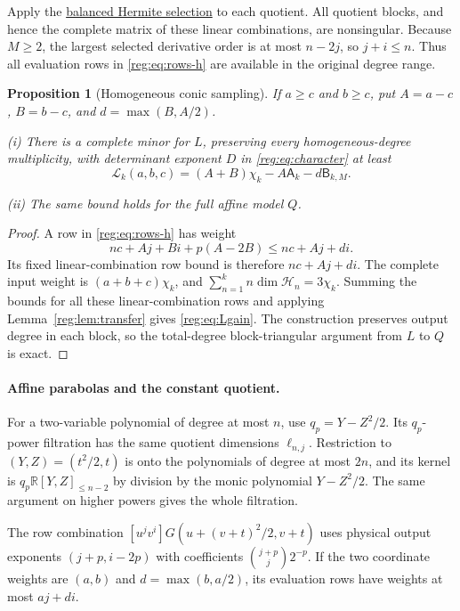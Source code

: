 \documentclass[11pt]{amsart}
\newtheorem{proposition}[theorem]{Proposition}
\theoremstyle{definition}
\theoremstyle{remark}
\newcommand{\R}{\mathbb R}
\numberwithin{equation}{section}
\begin{document}
Apply the \hyperref[reg:balanced-hermite]{balanced Hermite selection} to each quotient. All quotient blocks, and hence the complete matrix of these linear combinations, are nonsingular. Because $M\ge2$, the largest selected derivative order is at most $n-2j$, so $j+i\le n$. Thus all evaluation rows in \eqref{reg:eq:rows-h} are available in the original degree range.

\begin{proposition}[Homogeneous conic sampling]\label{reg:prop:L}
If $a\ge c$ and $b\ge c$, put $A=a-c$, $B=b-c$, and $d=\max(B,A/2)$.

\noindent\textup{(i)} There is a complete minor for $L$, preserving every homogeneous-degree multiplicity, with determinant exponent $D$ in \eqref{reg:eq:character} at least
\begin{equation}\label{reg:eq:Lgain}
 \mathcal L_k(a,b,c)=(A+B)\chi_k-A\mathsf A_k-d\mathsf B_{k,M}.
\end{equation}

\noindent\textup{(ii)} The same bound holds for the full affine model $Q$.
\end{proposition}
\begin{proof}
A row in \eqref{reg:eq:rows-h} has weight
\[
nc+Aj+Bi+p(A-2B)\le nc+Aj+di.
\]
Its fixed linear-combination row bound is therefore $nc+Aj+di$. The complete input weight is $(a+b+c)\chi_k$, and $\sum_{n=1}^k n\dim\mathcal H_n=3\chi_k$. Summing the bounds for all these linear-combination rows and applying Lemma~\ref{reg:lem:transfer} gives \eqref{reg:eq:Lgain}. The construction preserves output degree in each block, so the total-degree block-triangular argument from $L$ to $Q$ is exact.
\end{proof}

\paragraph{Affine parabolas and the constant quotient.}
For a two-variable polynomial of degree at most $n$, use $q_p=Y-Z^2/2$. Its $q_p$-power filtration has the same quotient dimensions $\ell_{n,j}$. Restriction to $(Y,Z)=(t^2/2,t)$ is onto the polynomials of degree at most $2n$, and its kernel is $q_p\R[Y,Z]_{\le n-2}$ by division by the monic polynomial $Y-Z^2/2$. The same argument on higher powers gives the whole filtration.

The row combination $[u^jv^i]G(u+(v+t)^2/2,v+t)$ uses physical output exponents $(j+p,i-2p)$ with coefficients $\binom{j+p}{j}2^{-p}$. If the two coordinate weights are $(a,b)$ and $d=\max(b,a/2)$, its evaluation rows have weights at most $aj+di$.
\end{document}
